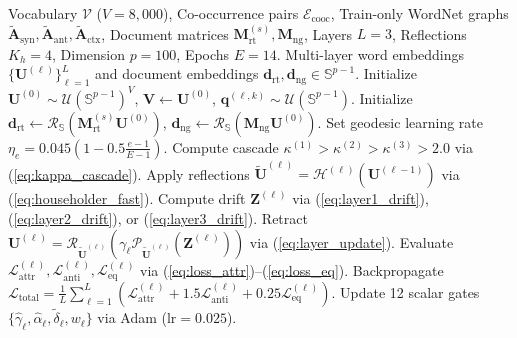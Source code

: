 \documentclass[journal]{IEEEtran}
\begin{document}
\begin{algorithm}[!t]
\caption{POLARIS Training and Foliation Procedure}
\label{alg:polaris}
\footnotesize
\begin{algorithmic}[1]
\Require Vocabulary $\mathcal{V}$ ($V=8,000$), Co-occurrence pairs $\mathcal{E}_{\text{cooc}}$, Train-only WordNet graphs $\tilde{\mathbf{A}}_{\text{syn}}, \tilde{\mathbf{A}}_{\text{ant}}, \tilde{\mathbf{A}}_{\text{ctx}}$, Document matrices $\mathbf{M}_{\text{rt}}^{(s)}, \mathbf{M}_{\text{ng}}$, Layers $L=3$, Reflections $K_h=4$, Dimension $p=100$, Epochs $E=14$.
\Ensure Multi-layer word embeddings $\{\mathbf{U}^{(\ell)}\}_{\ell=1}^L$ and document embeddings $\mathbf{d}_{\text{rt}}, \mathbf{d}_{\text{ng}} \in \mathbb{S}^{p-1}$.
\State Initialize $\mathbf{U}^{(0)} \sim \mathcal{U}(\mathbb{S}^{p-1})^V$, $\mathbf{V} \leftarrow \mathbf{U}^{(0)}$, $\mathbf{q}^{(\ell,k)} \sim \mathcal{U}(\mathbb{S}^{p-1})$.
\State Initialize $\mathbf{d}_{\text{rt}} \leftarrow \mathcal{R}_{\mathbb{S}}(\mathbf{M}_{\text{rt}}^{(s)}\mathbf{U}^{(0)})$, $\mathbf{d}_{\text{ng}} \leftarrow \mathcal{R}_{\mathbb{S}}(\mathbf{M}_{\text{ng}}\mathbf{U}^{(0)})$.
    \State Set geodesic learning rate $\eta_e = 0.045 \left(1 - 0.5\frac{e-1}{E-1}\right)$.
        \State Compute cascade $\kappa^{(1)} > \kappa^{(2)} > \kappa^{(3)} > 2.0$ via (\ref{eq:kappa_cascade}).
            \State Apply reflections $\tilde{\mathbf{U}}^{(\ell)} = \mathcal{H}^{(\ell)}(\mathbf{U}^{(\ell-1)})$ via (\ref{eq:householder_fast}).
            \State Compute drift $\mathbf{Z}^{(\ell)}$ via (\ref{eq:layer1_drift}), (\ref{eq:layer2_drift}), or (\ref{eq:layer3_drift}).
            \State Retract $\mathbf{U}^{(\ell)} = \mathcal{R}_{\tilde{\mathbf{U}}^{(\ell)}}(\gamma_\ell \mathcal{P}_{\tilde{\mathbf{U}}^{(\ell)}}(\mathbf{Z}^{(\ell)}))$ via (\ref{eq:layer_update}).
            \State Evaluate $\mathcal{L}_{\text{attr}}^{(\ell)}, \mathcal{L}_{\text{anti}}^{(\ell)}, \mathcal{L}_{\text{eq}}^{(\ell)}$ via (\ref{eq:loss_attr})--(\ref{eq:loss_eq}).
        \EndFor
        \State Backpropagate $\mathcal{L}_{\text{total}} = \frac{1}{L}\sum_{\ell=1}^L (\mathcal{L}_{\text{attr}}^{(\ell)} + 1.5\mathcal{L}_{\text{anti}}^{(\ell)} + 0.25\mathcal{L}_{\text{eq}}^{(\ell)})$.
        \State Update 12 scalar gates $\{\hat{\gamma}_\ell, \hat{\alpha}_\ell, \tilde{\delta}_\ell, w_\ell\}$ via Adam ($\text{lr}=0.025$).

\end{algorithmic}
\end{algorithm}
\end{document}
